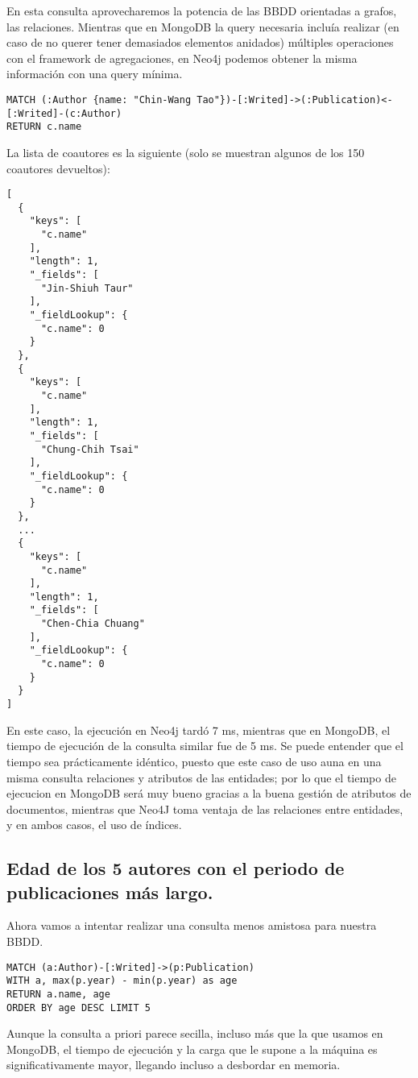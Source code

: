 En esta consulta aprovecharemos la potencia de las \gls{BBDD} orientadas a grafos, las relaciones. Mientras que en MongoDB la query necesaria incluía realizar (en caso de no querer tener demasiados elementos anidados) múltiples operaciones con el framework de agregaciones, en Neo4j podemos obtener la misma información con una query mínima. 

\begin{verbatim}
MATCH (:Author {name: "Chin-Wang Tao"})-[:Writed]->(:Publication)<-[:Writed]-(c:Author)
RETURN c.name
\end{verbatim}

La lista de coautores es la siguiente (solo se muestran algunos de los 150 coautores devueltos):

\begin{verbatim}
[
  {
    "keys": [
      "c.name"
    ],
    "length": 1,
    "_fields": [
      "Jin-Shiuh Taur"
    ],
    "_fieldLookup": {
      "c.name": 0
    }
  },
  {
    "keys": [
      "c.name"
    ],
    "length": 1,
    "_fields": [
      "Chung-Chih Tsai"
    ],
    "_fieldLookup": {
      "c.name": 0
    }
  },
  ...
  {
    "keys": [
      "c.name"
    ],
    "length": 1,
    "_fields": [
      "Chen-Chia Chuang"
    ],
    "_fieldLookup": {
      "c.name": 0
    }
  }
]
\end{verbatim}


En este caso, la ejecución en Neo4j tardó 7 ms, mientras que en MongoDB, el tiempo de ejecución de la consulta similar fue de 5 ms. Se puede entender que el tiempo sea prácticamente idéntico, puesto que este caso de uso auna en una misma consulta relaciones y atributos de las entidades; por lo que el tiempo de ejecucion en MongoDB será muy bueno gracias a la buena gestión de atributos de documentos, mientras que Neo4J toma ventaja de las relaciones entre entidades, y en ambos casos, el uso de índices.

\subsection{Edad de los 5 autores con el periodo de publicaciones más largo.}

Ahora vamos a intentar realizar una consulta menos amistosa para nuestra \gls{BBDD}.

\begin{verbatim}
MATCH (a:Author)-[:Writed]->(p:Publication)
WITH a, max(p.year) - min(p.year) as age
RETURN a.name, age
ORDER BY age DESC LIMIT 5
\end{verbatim}

Aunque la consulta a priori parece secilla, incluso más que la que usamos en MongoDB, el tiempo de ejecución y la carga que le supone a la máquina es significativamente mayor, llegando incluso a desbordar en memoria.
